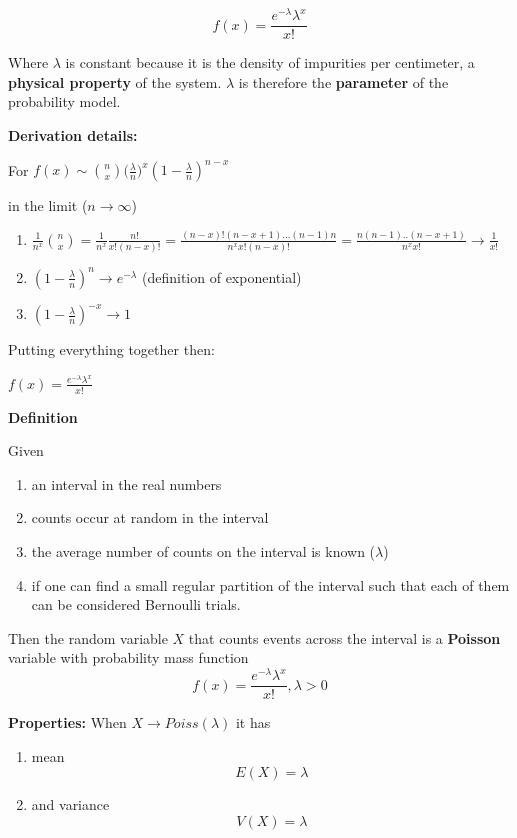 \documentclass[
]{book}
\providecommand{\tightlist}{%
  \setlength{\itemsep}{0pt}\setlength{\parskip}{0pt}}
\begin{document}
\[f(x)= \frac{e^{-\lambda}\lambda^x}{x!}\]

Where \(\lambda\) is constant because it is the density of impurities per centimeter, a \textbf{physical property} of the system. \(\lambda\) is therefore the \textbf{parameter} of the probability model.

\textbf{Derivation details:}

For \(f(x) \sim \binom n x \big(\frac{\lambda}{n}\big)^x(1-\frac{\lambda}{n})^{n-x}\)

in the limit (\(n \rightarrow \infty\))

\begin{enumerate}
\def\labelenumi{\arabic{enumi})}
\tightlist
\item
  \(\frac{1}{n^x}\binom n x =\frac{1}{n^x}\frac{n!}{x! (n-x)!}=\frac{(n-x)!(n-x+1)...(n-1)n}{n^x x! (n-x)!}=\frac{n(n-1)..(n-x+1)}{n^x x!} \rightarrow \frac{1}{x!}\)
\item
  \((1-\frac{\lambda}{n})^{n} \rightarrow e^{-\lambda}\) (definition of exponential)
\item
  \((1-\frac{\lambda}{n})^{-x} \rightarrow 1\)
\end{enumerate}

Putting everything together then:

\(f(x)= \frac{e^{-\lambda}\lambda^x}{x!}\)

\textbf{Definition}

Given

\begin{enumerate}
\def\labelenumi{\arabic{enumi})}
\tightlist
\item
  an interval in the real numbers
\item
  counts occur at random in the interval
\item
  the average number of counts on the interval is known (\(\lambda\))
\item
  if one can find a small regular partition of the interval such that each of them can be considered Bernoulli trials.
\end{enumerate}

Then the random variable \(X\) that counts events across the interval is a \textbf{Poisson} variable with probability mass function\\
\[f(x)= \frac{e^{-\lambda}\lambda^x}{x!}, \lambda>0\]

\textbf{Properties:}
When \(X \rightarrow Poiss(\lambda)\) it has

\begin{enumerate}
\def\labelenumi{\arabic{enumi})}
\tightlist
\item
  mean \[E(X)= \lambda\]
\item
  and variance \[V(X)= \lambda\]
\end{enumerate}
\end{document}
